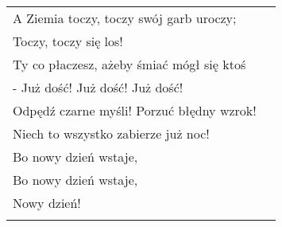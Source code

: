 \documentclass[a5paper]{article}
\begin{document}
\noindent
\begin{tabular}{@{}p{7.50cm}p{3cm}@{}}
A Ziemia toczy, toczy swój garb uroczy; \\
Toczy, toczy się los! \\
Ty co płaczesz, ażeby śmiać mógł się ktoś \\
- Już dość! Już dość! Już dość! \\
Odpędź czarne myśli! Porzuć błędny wzrok! \\
Niech to wszystko zabierze już noc! \\
Bo nowy dzień wstaje, \\
Bo nowy dzień wstaje, \\
Nowy dzień! \\ \\
\end{tabular} 
\end{document}
